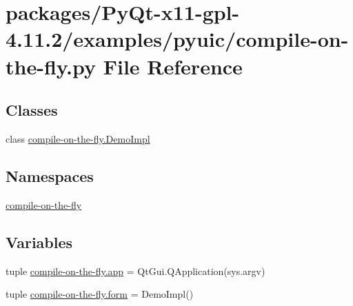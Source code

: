 \hypertarget{compile-on-the-fly_8py}{}\section{packages/\+Py\+Qt-\/x11-\/gpl-\/4.11.2/examples/pyuic/compile-\/on-\/the-\/fly.py File Reference}
\label{compile-on-the-fly_8py}
\subsection*{Classes}
\begin{DoxyCompactItemize}
\item 
class \hyperlink{classcompile-on-the-fly_1_1DemoImpl}{compile-\/on-\/the-\/fly.\+Demo\+Impl}
\end{DoxyCompactItemize}
\subsection*{Namespaces}
\begin{DoxyCompactItemize}
\item 
 \hyperlink{namespacecompile-on-the-fly}{compile-\/on-\/the-\/fly}
\end{DoxyCompactItemize}
\subsection*{Variables}
\begin{DoxyCompactItemize}
\item 
tuple \hyperlink{namespacecompile-on-the-fly_a4cf7e648c5fc9046228fa1398e020e36}{compile-\/on-\/the-\/fly.\+app} = Qt\+Gui.\+Q\+Application(sys.\+argv)
\item 
tuple \hyperlink{namespacecompile-on-the-fly_ac173e2f992355532c516086827a24bfa}{compile-\/on-\/the-\/fly.\+form} = Demo\+Impl()
\end{DoxyCompactItemize}
